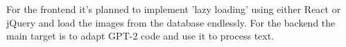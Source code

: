 \documentclass[12pt]{report}
\begin{document}
    For the frontend it's planned to implement 'lazy loading' using either React or jQuery and load the images from the database endlessly. 
    For the backend the main target is to adapt GPT-2 code and use it to process text.

    {}
    
\end{document}
